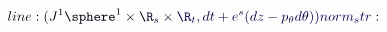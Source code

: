 \documentclass[12pt]{article}
\begin{document}
\makeatletter
\renewcommand*{\@textcolor}[3]{%
  \protect\leavevmode
  \begingroup
    \color#1{#2}#3%
  \endgroup
}
\makeatother
\begin{displaymath}
\mathcolor[RGB]{0,0,15}{line:
(J^1\sphere^1\times} \mathcolor[RGB]{0,0,30}{\R_s} \mathcolor[RGB]{0,0,45}{\times} \mathcolor[RGB]{0,0,60}{\R_t,dt+e^s(dz-p_\theta} \mathcolor[RGB]{0,0,75}{d\theta))

norm_str:}
\end{displaymath}
\end{document}
